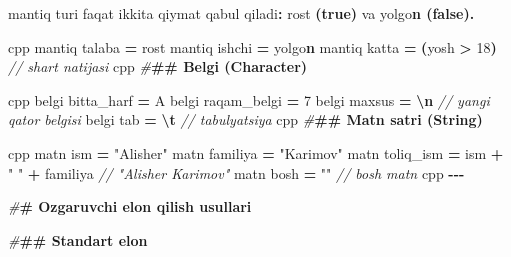 \documentclass[a4paper,11pt,twoside,openright]{book}
\newenvironment{Shaded}{\begin{snugshade}}{\end{snugshade}}
\newcommand{\CharTok}[1]{\textcolor[rgb]{0.31,0.60,0.02}{#1}}
\newcommand{\CommentTok}[1]{\textcolor[rgb]{0.56,0.35,0.01}{\textit{#1}}}
\newcommand{\DecValTok}[1]{\textcolor[rgb]{0.00,0.00,0.81}{#1}}
\newcommand{\ErrorTok}[1]{\textcolor[rgb]{0.64,0.00,0.00}{\textbf{#1}}}
\newcommand{\KeywordTok}[1]{\textcolor[rgb]{0.13,0.29,0.53}{\textbf{#1}}}
\newcommand{\NormalTok}[1]{#1}
\newcommand{\OperatorTok}[1]{\textcolor[rgb]{0.81,0.36,0.00}{\textbf{#1}}}
\newcommand{\PreprocessorTok}[1]{\textcolor[rgb]{0.56,0.35,0.01}{\textit{#1}}}
\newcommand{\SpecialCharTok}[1]{\textcolor[rgb]{0.81,0.36,0.00}{\textbf{#1}}}
\newcommand{\StringTok}[1]{\textcolor[rgb]{0.31,0.60,0.02}{#1}}
\begin{document}
\begin{Shaded}
\begin{Highlighting}[]
\ErrorTok{\textasciigrave{}}\NormalTok{mantiq}\ErrorTok{\textasciigrave{}}\NormalTok{ turi faqat ikkita qiymat qabul qiladi}\OperatorTok{:} \ErrorTok{\textasciigrave{}}\NormalTok{rost}\ErrorTok{\textasciigrave{}} \OperatorTok{(}\KeywordTok{true}\OperatorTok{)}\NormalTok{ va }\ErrorTok{\textasciigrave{}}\NormalTok{yolg}\CharTok{\textquotesingle{}o}\ErrorTok{n\textasciigrave{} (false).}

\ErrorTok{\textasciigrave{}\textasciigrave{}\textasciigrave{}}\NormalTok{cpp}
\NormalTok{mantiq talaba }\OperatorTok{=}\NormalTok{ rost}
\NormalTok{mantiq ishchi }\OperatorTok{=}\NormalTok{ yolg}\CharTok{\textquotesingle{}o}\ErrorTok{n}
\NormalTok{mantiq katta }\OperatorTok{=} \OperatorTok{(}\NormalTok{yosh }\OperatorTok{\textgreater{}} \DecValTok{18}\OperatorTok{)}    \CommentTok{// shart natijasi}
\ErrorTok{\textasciigrave{}\textasciigrave{}\textasciigrave{}}\NormalTok{cpp}
\PreprocessorTok{\#}\ErrorTok{\#\# Belgi (Character)}

\ErrorTok{\textasciigrave{}\textasciigrave{}\textasciigrave{}}\NormalTok{cpp}
\NormalTok{belgi bitta\_harf }\OperatorTok{=} \CharTok{\textquotesingle{}A\textquotesingle{}}
\NormalTok{belgi raqam\_belgi }\OperatorTok{=} \CharTok{\textquotesingle{}7\textquotesingle{}}
\NormalTok{belgi maxsus }\OperatorTok{=} \CharTok{\textquotesingle{}}\SpecialCharTok{\textbackslash{}n}\CharTok{\textquotesingle{}}           \CommentTok{// yangi qator belgisi}
\NormalTok{belgi tab }\OperatorTok{=} \CharTok{\textquotesingle{}}\SpecialCharTok{\textbackslash{}t}\CharTok{\textquotesingle{}}              \CommentTok{// tabulyatsiya}
\ErrorTok{\textasciigrave{}\textasciigrave{}\textasciigrave{}}\NormalTok{cpp}
\PreprocessorTok{\#}\ErrorTok{\#\# Matn satri (String)}

\ErrorTok{\textasciigrave{}\textasciigrave{}\textasciigrave{}}\NormalTok{cpp}
\NormalTok{matn ism }\OperatorTok{=} \StringTok{"Alisher"}
\NormalTok{matn familiya }\OperatorTok{=} \StringTok{"Karimov"}
\NormalTok{matn toliq\_ism }\OperatorTok{=}\NormalTok{ ism }\OperatorTok{+} \StringTok{" "} \OperatorTok{+}\NormalTok{ familiya   }\CommentTok{// "Alisher Karimov"}
\NormalTok{matn bosh }\OperatorTok{=} \StringTok{""}                            \CommentTok{// bo\textquotesingle{}sh matn}
\ErrorTok{\textasciigrave{}\textasciigrave{}\textasciigrave{}}\NormalTok{cpp}
\OperatorTok{{-}{-}{-}}

\PreprocessorTok{\#}\ErrorTok{\# O\textquotesingle{}zgaruvchi e\textquotesingle{}lon qilish usullari}

\PreprocessorTok{\#}\ErrorTok{\#\# Standart e\textquotesingle{}lon}


\end{Highlighting}
\end{Shaded}
\end{document}
